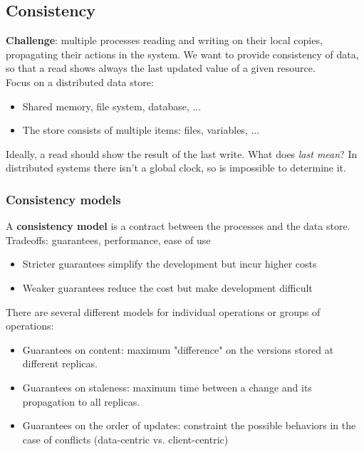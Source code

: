 \documentclass[10pt,a4paper]{article}
\begin{document}
\subsection{Consistency}
\textbf{Challenge}: multiple processes reading and writing on their local copies, propagating their actions in the system. We want to provide consistency of data, so that a read shows always the last updated value of a given resource. \\
Focus on a distributed data store:
\begin{itemize}
	\item Shared memory, file system, database, ...
	\item The store consists of multiple items: files, variables, ...
\end{itemize}
Ideally, a read should show the result of the last write. What does \textit{last mean}? In distributed systems there isn't a global clock, so is impossible to determine it.
\subsubsection{Consistency models}
A \textbf{consistency model} is a contract between the processes and the data store. \\
Tradeoffs: guarantees, performance, ease of use
\begin{itemize}
	\item Stricter guarantees simplify the development but incur higher costs
	\item Weaker guarantees reduce the cost but make development difficult
\end{itemize}
There are several different models for individual operations or groups of operations:
\begin{itemize}
	\item Guarantees on content: maximum "difference" on the versions stored at different replicas.
	\item Guarantees on staleness: maximum time between a change and its propagation to all replicas.
	\item Guarantees on the order of updates: constraint the possible behaviors in the case of conflicts (data-centric vs. client-centric)
\end{itemize}
\end{document}
